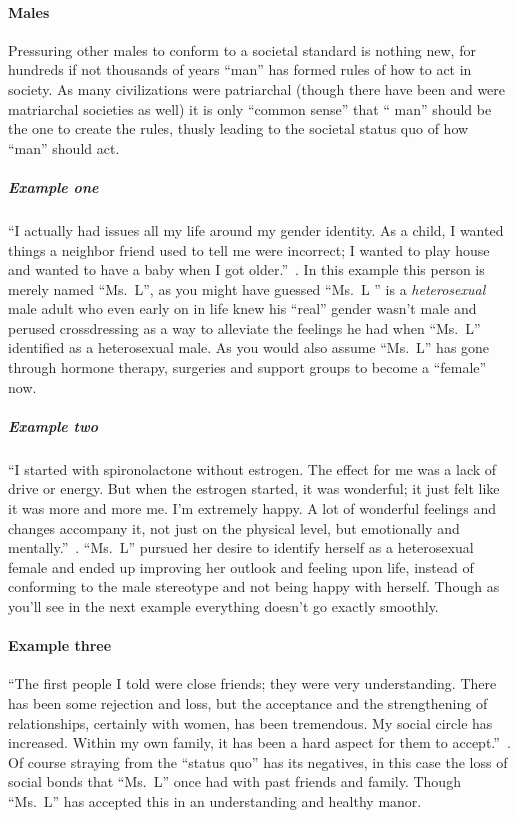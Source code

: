\paragraph{Males}
Pressuring other males to conform to a societal standard is
nothing new, for hundreds if not thousands of years ``man'' has formed rules of
how to act in society. As many civilizations were patriarchal (though there have
been and were matriarchal societies as well) it is only ``common sense'' that ``
man'' should be the one to create the rules, thusly leading to the societal
status quo of how ``man'' should act.
\par

\subparagraph{Example one}
``I actually had issues all my life around my gender identity. As a child, I
wanted things a neighbor friend used to tell me were incorrect; I wanted to play
house and wanted to have a baby when I got older.''~\cite[p.~478]{MOT}. In this
example this person is merely named ``Ms.~L'', as you might have guessed ``Ms.~L
'' is a \textit{heterosexual} male adult who even early on in life knew his
``real'' gender wasn't male and perused crossdressing as a way to alleviate the
feelings he had when ``Ms.~L'' identified as a heterosexual male. As you would
also assume ``Ms.~L'' has gone through hormone therapy, surgeries and support
groups to become a ``female'' now.
\par

\subparagraph{Example two}
``I started with spironolactone without estrogen. The effect for me was a lack
of drive or energy. But when the estrogen started, it was wonderful; it just
felt like it was more and more me. I’m extremely happy. A lot of wonderful
feelings and changes accompany it, not just on the physical level, but
emotionally and mentally.''~\cite[p.~479]{MOT}. ``Ms.~L'' pursued her desire to
identify herself as a heterosexual female and ended up improving her outlook and
feeling upon life, instead of conforming to the male stereotype and not being
happy with herself. Though as you'll see in the next example everything doesn't
go exactly smoothly.
\par

\paragraph{Example three}
``The first people I told were close friends; they were very understanding.
There has been some rejection and loss, but the acceptance and the strengthening
of relationships, certainly with women, has been tremendous. My social circle
has increased. Within my own family, it has been a hard aspect for them to
accept.''~\cite[p.~478-479]{MOT}. Of course straying from the ``status quo''
has its negatives, in this case the loss of social bonds that ``Ms.~L'' once had
with past friends and family. Though ``Ms.~L'' has accepted this in an
understanding and healthy manor.
\par

